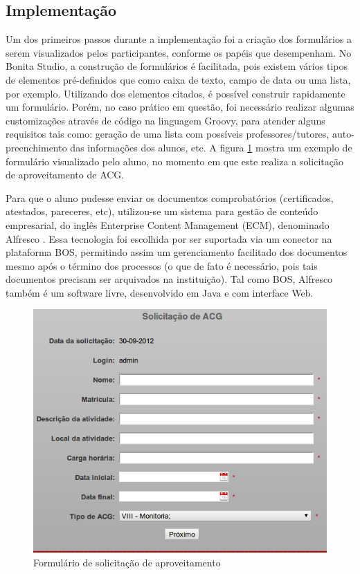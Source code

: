 \documentclass[12pt]{article}
\begin{document}
\subsection{Implementação}


Um dos primeiros passos durante a implementação foi a criação dos formulários a serem visualizados pelos participantes, conforme os papéis que desempenham. No Bonita Studio, a construção de formulários é facilitada, pois existem vários tipos de elementos pré-definidos que como caixa de texto, campo de data ou uma lista, por exemplo. Utilizando dos elementos citados, é possível construir rapidamente um formulário. Porém, no caso prático em questão, foi necessário realizar algumas customizações através de código na linguagem Groovy, para atender alguns requisitos tais como: geração de uma lista com possíveis professores/tutores, auto-preenchimento das informações dos alunos, etc. A figura \ref{fig:form}  mostra um exemplo de formulário visualizado pelo aluno, no momento em que este realiza a solicitação de aproveitamento de ACG.

Para que o aluno pudesse enviar os documentos comprobatórios (certificados, atestados, pareceres, etc), utilizou-se um sistema para gestão de conteúdo empresarial, do inglês Enterprise Content Management (ECM), denominado Alfresco \cite{ALFRESCO}. Essa tecnologia foi escolhida por ser suportada via um conector na plataforma BOS, permitindo assim um gerenciamento facilitado dos documentos mesmo após o término dos processos (o que de fato é necessário, pois tais documentos precisam ser arquivados na instituição). Tal como BOS, Alfresco também é um software livre, desenvolvido em Java e com interface Web.

\begin{figure}[ht]
\centering
\includegraphics[width=.6\textwidth]{images/formSolicitacao.png}
\caption{Formulário de solicitação de aproveitamento}
\label{fig:form}
\end{figure}
\end{document}

